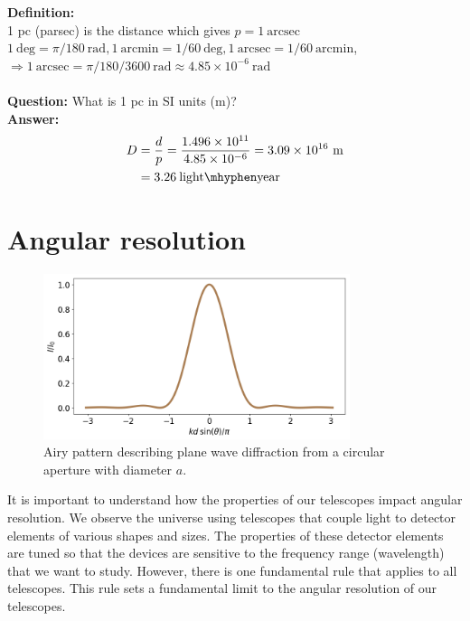 \documentclass[a4paper,12pt]{article}
\theoremstyle{remark}
\newcommand{\mrm}[1]{\mathrm{#1}}
\renewcommand{\=}[1]{\stackrel{#1}{=}} %
\theoremstyle{plain}
\theoremstyle{definition}
\begin{document}
\textbf{Definition:} \\
1 pc (parsec) is the distance which gives $p = 1 \ \mrm{arcsec}$ \\
$1 \ \mrm{deg} = \pi / 180 \ \mrm{rad}, 1 \ \mrm{arcmin} = 1/60 \ \mrm{deg}, 1 \ \mrm{arcsec} = 1/60 \ \mrm{arcmin}$,  \\
$\Rightarrow 1 \ \mrm{arcsec} = \pi / 180 / 3600 \ \mrm{rad} \approx 4.85 \times 10^{-6} \ \mrm{rad}$ \\ \\
\textbf{Question:} What is 1 pc in SI units (m)? \\
\textbf{Answer:}
\begin{align}
D &= \frac{d}{p} = \frac{1.496 \times 10^{11} }{4.85 \times 10^{-6}} = 3.09 \times 10^{16} \ \mrm{m} \nonumber \\
 &= 3.26 \:\mrm{light \mhyphen year}
\end{align}

\section{Angular resolution}
\begin{figure}[t]
\begin{center}
    \includegraphics*[angle=0,width=0.8\textwidth]{img/airy_pattern.png}
    \caption[Insert text]{Airy pattern describing plane wave diffraction from a circular aperture with diameter $a$.}
\label{fig:airy}
\end{center}
\end{figure}

It is important to understand how the properties of our telescopes impact angular resolution. We observe the universe using telescopes that couple light to detector elements of various shapes and sizes. The properties of these detector elements are tuned so that the devices are sensitive to the frequency range (wavelength) that we want to study. However, there is one fundamental rule that applies to all telescopes. This rule sets a fundamental limit to the angular resolution of our telescopes.
\end{document}
